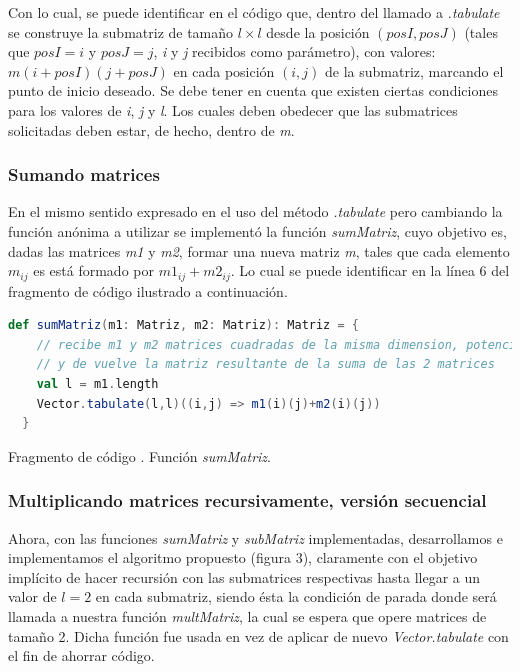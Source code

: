 \documentclass{article}
\newcounter{codesnippet}
\newcommand{\newcodesnippet}{%
  \stepcounter{codesnippet}%
}
\begin{document}
Con lo cual, se puede identificar en el código que, dentro del llamado a \textit{.tabulate} se construye la submatriz de tamaño \(l \times l\) desde la posición \((posI, posJ)\) (tales que \(posI = i\) y \(posJ = j\), \textit{i} y \textit{j} recibidos como parámetro), con valores: \(m(i + posI)(j + posJ)\) en cada posición \((i,j)\) de la submatriz, marcando el punto de inicio deseado. Se debe tener en cuenta que existen ciertas condiciones para los valores de \textit{i}, \textit{j} y \textit{l}. Los cuales deben obedecer que las submatrices solicitadas deben estar, de hecho, dentro de \textit{m}.

\subsubsection{Sumando matrices}

En el mismo sentido expresado en el uso del método \textit{.tabulate} pero cambiando la función anónima a utilizar se implementó la función \textit{sumMatriz}, cuyo objetivo es, dadas las matrices \textit{m1} y \textit{m2}, formar una nueva matriz \textit{m}, tales que cada elemento \(m_{ij}\) es está formado por \(m1_{ij} + m2_{ij}\). Lo cual se puede identificar en la línea 6 del fragmento de código ilustrado a continuación.\\

\newcodesnippet
\begin{lstlisting}[language=Scala]
  def sumMatriz(m1: Matriz, m2: Matriz): Matriz = {
    // recibe m1 y m2 matrices cuadradas de la misma dimension, potencia de 2
    // y de vuelve la matriz resultante de la suma de las 2 matrices
    val l = m1.length
    Vector.tabulate(l,l)((i,j) => m1(i)(j)+m2(i)(j))
  }
\end{lstlisting}
\begin{center}
    \small{Fragmento de código \thecodesnippet. Función \textit{sumMatriz}.}
\end{center}
\subsubsection{Multiplicando matrices recursivamente, versión secuencial}

Ahora, con las funciones \textit{sumMatriz} y \textit{subMatriz} implementadas, desarrollamos e implementamos el algoritmo propuesto (figura 3), claramente con el objetivo implícito de hacer recursión con las submatrices respectivas hasta llegar a un valor de \(l = 2\) en cada submatriz, siendo ésta la condición de parada donde será llamada a nuestra función \textit{multMatriz}, la cual se espera que opere matrices de tamaño 2. Dicha función fue usada en vez de aplicar de nuevo \textit{Vector.tabulate} con el fin de ahorrar código.\\
\end{document}
